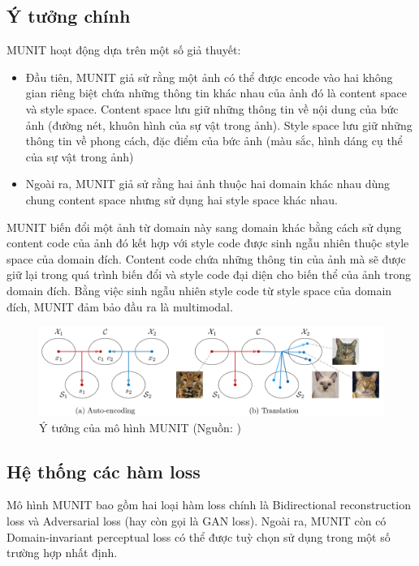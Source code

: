 {    \subsection{Ý tưởng chính}
    MUNIT hoạt động dựa trên một số giả thuyết:
    \begin{itemize}[leftmargin=0cm,itemindent=.5cm,labelwidth=\itemindent,labelsep=0cm,align=left]
        \item Đầu tiên, MUNIT giả sử rằng một ảnh có thể được encode vào hai không gian riêng biệt chứa những thông tin khác nhau của ảnh đó là content space và style space. Content space lưu giữ những thông tin về nội dung của bức ảnh (đường nét, khuôn hình của sự vật trong ảnh). Style space lưu giữ những thông tin về phong cách, đặc điểm của bức ảnh (màu sắc, hình dáng cụ thể của sự vật trong ảnh)
        \item Ngoài ra, MUNIT giả sử rằng hai ảnh thuộc hai domain khác nhau dùng chung content space nhưng sử dụng hai style space khác nhau.
    \end{itemize}
    \noindent MUNIT biến đổi một ảnh từ domain này sang domain khác bằng cách sử dụng content code của ảnh đó kết hợp với style code được sinh ngẫu nhiên thuộc style space của domain đích. Content code chứa những thông tin của ảnh mà sẽ được giữ lại trong quá trình biến đổi và style code đại diện cho biến thể của ảnh trong domain đích. Bằng việc sinh ngẫu nhiên style code từ style space của domain đích, MUNIT đảm bảo đầu ra là multimodal.
    \begin{figure}[H]
    \centering
    \includegraphics[width=12cm] {images/idea_munit.png}
    \caption{Ý tưởng của mô hình MUNIT (Nguồn: \cite{munit})}
    \label{fig:idea_munit}
    \end{figure}

    \subsection{Hệ thống các hàm loss}
    \noindent Mô hình MUNIT bao gồm hai loại hàm loss chính là Bidirectional reconstruction loss và Adversarial loss (hay còn gọi là GAN loss). Ngoài ra, MUNIT còn có Domain-invariant perceptual loss có thể được tuỳ chọn sử dụng trong một số trường hợp nhất định.

}
